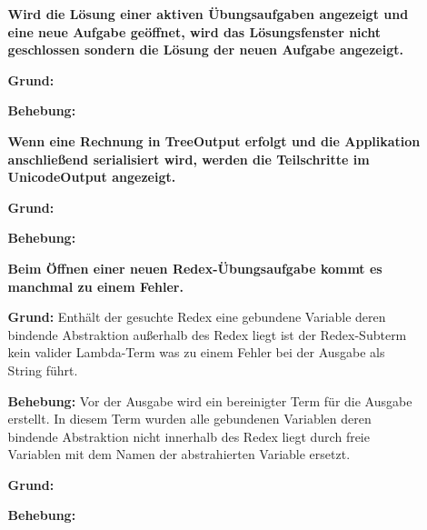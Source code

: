\documentclass[parskip=full,11pt,openany]{scrreprt}
\begin{document}
\begin{itemize}[itemsep=3ex]

\item[] %
\begin{itemize}[noitemsep]
\item[] {\bfseries Wird die Lösung einer aktiven Übungsaufgaben angezeigt und eine neue Aufgabe geöffnet, wird das Lösungsfenster nicht geschlossen sondern die Lösung der neuen Aufgabe angezeigt. }
\item [\textbf{Grund:}]
\item [\textbf{Behebung:}]
\end{itemize}

\item[] %
\begin{itemize}[noitemsep]
\item[] {\bfseries Wenn eine Rechnung in TreeOutput erfolgt und die Applikation anschließend serialisiert wird, werden die Teilschritte im UnicodeOutput angezeigt. }
\item [\textbf{Grund:}]
\item [\textbf{Behebung:}]
\end{itemize}

\item[] %
\begin{itemize}[noitemsep]
\item[] {\bfseries Beim Öffnen einer neuen Redex-Übungsaufgabe kommt es manchmal zu einem Fehler. }
\item [\textbf{Grund:}] Enthält der gesuchte Redex eine gebundene Variable deren bindende Abstraktion außerhalb des Redex liegt ist der Redex-Subterm kein valider Lambda-Term was zu einem Fehler bei der Ausgabe als String führt. 
\item [\textbf{Behebung:}]  Vor der Ausgabe wird ein bereinigter Term für die Ausgabe erstellt. In diesem Term wurden alle gebundenen Variablen deren bindende Abstraktion nicht innerhalb des Redex liegt durch freie Variablen mit dem Namen der abstrahierten Variable ersetzt.
\end{itemize}

\item[] %
\begin{itemize}[noitemsep]
\item[] {\bfseries  }
\item [\textbf{Grund:}]
\item [\textbf{Behebung:}]
\end{itemize}


\end{itemize}
\end{document}
